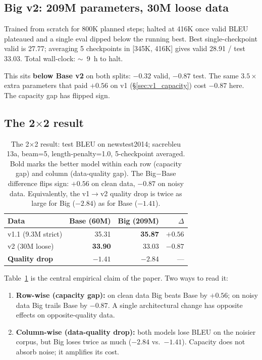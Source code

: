 \subsection{Big v2: 209M parameters, 30M loose data}
\label{sec:big_v2}
Trained from scratch for 800K planned steps; halted at 416K once valid BLEU plateaued and a single eval dipped below the running best. Best single-checkpoint valid is 27.77; averaging 5 checkpoints in [345K, 416K] gives valid 28.91 / test 33.03. Total wall-clock: $\sim$~9~h to halt.

This sits \textbf{below Base v2} on both splits: $-0.32$ valid, $-0.87$ test. The same $3.5\times$ extra parameters that paid $+0.56$ on v1 (\S\ref{sec:v1_capacity}) cost $-0.87$ here. The capacity gap has flipped sign.

\subsection{The 2$\times$2 result}
\label{sec:two_by_two}

\begin{table}[t]
\centering
\small
\begin{tabular}{lrrr}
\toprule
\textbf{Data} & \textbf{Base (60M)} & \textbf{Big (209M)} & \textbf{$\Delta$} \\
\midrule
v1.1 (9.3M strict) & 35.31 & \textbf{35.87} & $\mathbf{+0.56}$ \\
v2 (30M loose)     & \textbf{33.90} & 33.03 & $\mathbf{-0.87}$ \\
\midrule
\textbf{Quality drop} & $-1.41$ & $-2.84$ & --- \\
\bottomrule
\end{tabular}
\caption{The 2$\times$2 result: test BLEU on newstest2014; sacrebleu 13a, beam=5, length-penalty=1.0, 5-checkpoint averaged. Bold marks the better model within each row (capacity gap) and column (data-quality gap). The Big$-$Base difference flips sign: $+0.56$ on clean data, $-0.87$ on noisy data. Equivalently, the v1$\rightarrow$v2 quality drop is twice as large for Big ($-2.84$) as for Base ($-1.41$).}
\label{tab:two_by_two}
\end{table}

Table~\ref{tab:two_by_two} is the central empirical claim of the paper. Two ways to read it:
\begin{enumerate}
\item \textbf{Row-wise (capacity gap):} on clean data Big beats Base by $+0.56$; on noisy data Big trails Base by $-0.87$. A single architectural change has opposite effects on opposite-quality data.
\item \textbf{Column-wise (data-quality drop):} both models lose BLEU on the noisier corpus, but Big loses twice as much ($-2.84$ vs.\ $-1.41$). Capacity does not absorb noise; it amplifies its cost.
\end{enumerate}

